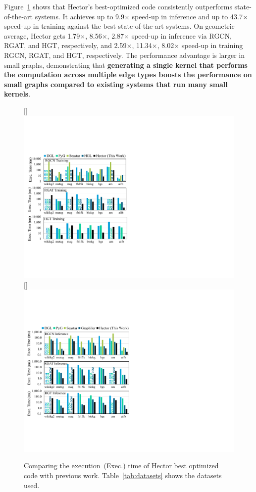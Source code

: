 Figure~\ref{fig:inference_results} shows that Hector's best-optimized code consistently outperforms state-of-the-art systems. It achieves up to 9.9$\times$ speed-up in inference and up to 43.7$\times$ speed-up in training against the best state-of-the-art systems. On geometric average, Hector gets 1.79$\times$, 8.56$\times$, 2.87$\times$ speed-up in inference via RGCN, RGAT, and HGT, respectively, and 2.59$\times$, 11.34$\times$, 8.02$\times$ speed-up in training RGCN, RGAT, and HGT, respectively. The performance advantage is larger in small graphs, demonstrating that \textbf{generating a single kernel that performs the computation across multiple edge types boosts the performance on small graphs %
compared to existing systems that run many small kernels}. 



\begin{figure}[!htbp]\captionsetup[subfigure]{font=small}
\centering
{}
[\linewidth]{\includegraphics[scale=0.8]{figures/Hector/training_time_final.pdf}}
[\linewidth]{\includegraphics[scale=0.8]{figures/Hector/inference_time_final.pdf}}
\caption{\label{fig:inference_results} Comparing the execution~(Exec.) time of Hector best optimized code with previous work. Table~\ref{tab:datasets} shows the datasets used. }
\end{figure}

